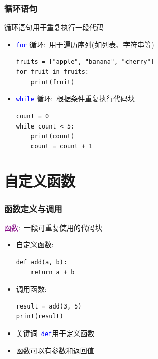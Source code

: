 \begin{frame}[fragile]
    \frametitle{循环语句}
    循环语句用于重复执行一段代码
    \begin{itemize}
	    \item \texttt{\textcolor{blue}{for}} 循环:~用于遍历序列(如列表、字符串等)
        \begin{lstlisting}[style=pythonstyle]
fruits = ["apple", "banana", "cherry"]
for fruit in fruits:
    print(fruit)
        \end{lstlisting}
\item \texttt{\textcolor{blue}{while}} 循环:~根据条件重复执行代码块
        \begin{lstlisting}[style=pythonstyle]
count = 0
while count < 5:
    print(count)
    count = count + 1
        \end{lstlisting}
    \end{itemize}
\end{frame}
%
\section{自定义函数}
\begin{frame}[fragile]
    \frametitle{函数定义与调用}
\textcolor{purple}{函数}:~一段可重复使用的代码块
\begin{itemize}
	\item 自定义函数:~
    \begin{lstlisting}[style=pythonstyle]
def add(a, b):
    return a + b
    \end{lstlisting}
    \item 调用函数:~
    \begin{lstlisting}[style=pythonstyle]
result = add(3, 5)
print(result)
    \end{lstlisting}
\end{itemize}
    \begin{itemize}
	    \item 关键词~\texttt{\textcolor{blue}{def}}用于定义函数
	    \item 函数可以有参数{\fontsize{7.2pt}{4.2pt}}和返回值{\fontsize{7.2pt}{4.2pt}}
    \end{itemize}
\end{frame}
%
